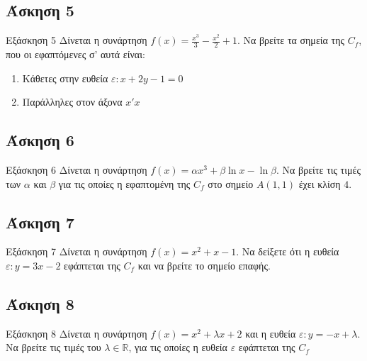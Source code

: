 \documentclass[greek]{beamer}
\begin{document}
\subsection{Άσκηση 5}
\begin{frame}[label=Άσκηση5]{Εξάσκηση 5}
  Δίνεται η συνάρτηση $f(x)=\frac{x^3}{3}-\frac{x^2}{2}+1$. Να βρείτε τα σημεία της $C_f$, που οι εφαπτόμενες σ' αυτά είναι:
  \begin{enumerate}
    \item<1-> Κάθετες στην ευθεία $ε:x+2y-1=0$
    \item<2-> Παράλληλες στον άξονα $x'x$
  \end{enumerate}

\end{frame}

\subsection{Άσκηση 6}
\begin{frame}[label=Άσκηση6]{Εξάσκηση 6}
  Δίνεται η συνάρτηση $f(x)=αx^3+β\ln x-\ln β$. Να βρείτε τις τιμές των $α$ και $β$ για τις οποίες η εφαπτομένη της $C_f$ στο σημείο $Α(1,1)$ έχει κλίση $4$.

\end{frame}

\subsection{Άσκηση 7}
\begin{frame}[label=Άσκηση7]{Εξάσκηση 7}
  Δίνεται η συνάρτηση $f(x)=x^2+x-1$. Να δείξετε ότι η ευθεία $ε:y=3x-2$ εφάπτεται της $C_f$ και να βρείτε το σημείο επαφής.

\end{frame}

\subsection{Άσκηση 8}
\begin{frame}[label=Άσκηση8]{Εξάσκηση 8}
  Δίνεται η συνάρτηση $f(x)=x^2+λx+2$ και η ευθεία $ε:y=-x+λ$. Να βρείτε τις τιμές του $λ\in\mathbb{R}$, για τις οποίες η ευθεία $ε$ εφάπτεται της $C_f$

\end{frame}
\end{document}
